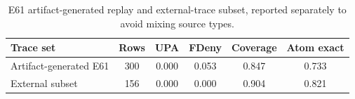 \begin{table}[t]
\centering
\small
\caption{E61 artifact-generated replay and external-trace subset, reported separately to avoid mixing source types.}
\label{tab:e61-combined}
\begin{tabular}{lccccc}
\toprule
Trace set & Rows & UPA & FDeny & Coverage & Atom exact \\
\midrule
Artifact-generated E61 & 300 & 0.000 & 0.053 & 0.847 & 0.733 \\
External subset & 156 & 0.000 & 0.000 & 0.904 & 0.821 \\
\bottomrule
\end{tabular}
\end{table}
